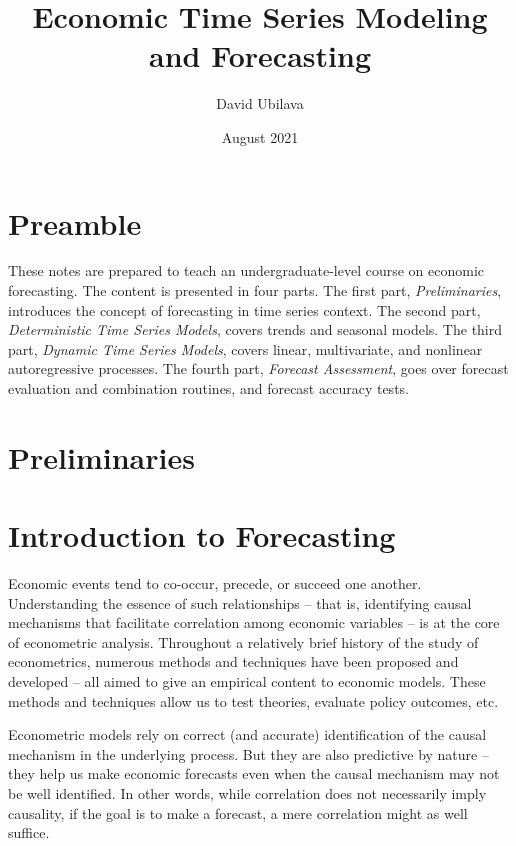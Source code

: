 \documentclass[
  oneside]{book}
\title{Economic Time Series Modeling and Forecasting}
\author{David Ubilava}
\date{August 2021}
\begin{document}
\maketitle

{
\setcounter{tocdepth}{1}
\tableofcontents
}
\hypertarget{preamble}{%
\chapter*{Preamble}\label{preamble}}

These notes are prepared to teach an undergraduate-level course on economic forecasting. The content is presented in four parts. The first part, \emph{Preliminaries}, introduces the concept of forecasting in time series context. The second part, \emph{Deterministic Time Series Models}, covers trends and seasonal models. The third part, \emph{Dynamic Time Series Models}, covers linear, multivariate, and nonlinear autoregressive processes. The fourth part, \emph{Forecast Assessment}, goes over forecast evaluation and combination routines, and forecast accuracy tests.

\hypertarget{preliminaries}{%
\chapter*{Preliminaries}\label{preliminaries}}

\hypertarget{introduction-to-forecasting}{%
\chapter{Introduction to Forecasting}\label{introduction-to-forecasting}}

Economic events tend to co-occur, precede, or succeed one another. Understanding the essence of such relationships -- that is, identifying causal mechanisms that facilitate correlation among economic variables -- is at the core of econometric analysis. Throughout a relatively brief history of the study of econometrics, numerous methods and techniques have been proposed and developed -- all aimed to give an empirical content to economic models. These methods and techniques allow us to test theories, evaluate policy outcomes, etc.

Econometric models rely on correct (and accurate) identification of the causal mechanism in the underlying process. But they are also predictive by nature -- they help us make economic forecasts even when the causal mechanism may not be well identified. In other words, while correlation does not necessarily imply causality, if the goal is to make a forecast, a mere correlation might as well suffice.
\end{document}
